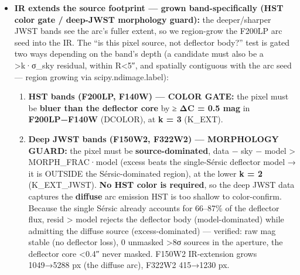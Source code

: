 \documentclass[
]{article}
\providecommand{\tightlist}{%
  \setlength{\itemsep}{0pt}\setlength{\parskip}{0pt}}
\newcommand{\BreakablePath}[1]{{\ttfamily\sloppy #1}}
\begin{document}
\begin{itemize}
  \begin{itemize}
  \tightlist
  \item
    \emph{Implementation gotcha (documented so it isn't reintroduced):}
    \BreakablePath{astropy.\discretionary{}{}{}modeling.\discretionary{}{}{}Sersic2D}'s
    \BreakablePath{amplitude} parameter is \textbf{I(r\_eff), not the
    central peak}. Since I(0)/I(r\_eff)=exp(b\_n)≈2150 at n=4,
    initialising \BreakablePath{amplitude} at the data peak
    over-predicts the centre \textasciitilde2000× and LevMar collapses
    the amplitude to ≈0 (the whole galaxy then reads as positive
    residual → catastrophic over-masking). Initialise
    \BreakablePath{amplitude ≈ peak·exp(−b\_\discretionary{}{}{}n)}
    (\textasciitilde peak·0.05 for n≈3) and \textbf{bound it to
    (peak·1e-3, peak·1.5)}, exactly as
    \BreakablePath{sersic\_\discretionary{}{}{}total\_\discretionary{}{}{}photometry.\discretionary{}{}{}fit\_\discretionary{}{}{}sersic2d}.
  \end{itemize}
\item
  \textbf{IR extends the source footprint --- grown band-specifically
  (HST color gate / deep-JWST morphology guard):} the deeper/sharper
  JWST bands see the arc's fuller extent, so we region-grow the F200LP
  arc seed into the IR. The ``is this pixel source, not deflector
  body?'' test is gated two ways depending on the band's depth (a
  candidate must also be a \textgreater k·σ\_sky residual, within
  R\textless5″, and spatially contiguous with the arc seed --- region
  growing via
  \BreakablePath{scipy.\discretionary{}{}{}ndimage.\discretionary{}{}{}label}):

  \begin{enumerate}
  \def\labelenumi{\arabic{enumi}.}
  \tightlist
  \item
    \textbf{HST bands (F200LP, F140W) --- COLOR GATE:} the pixel must be
    \textbf{bluer than the deflector core} by ≥ \textbf{ΔC = 0.5 mag} in
    \textbf{F200LP−F140W} (\BreakablePath{DCOLOR}), at \textbf{k = 3}
    (\BreakablePath{K\_\discretionary{}{}{}EXT}).
  \item
    \textbf{Deep JWST bands (F150W2, F322W2) --- MORPHOLOGY GUARD:} the
    pixel must be \textbf{source-dominated},
    \BreakablePath{data − sky − model > MORPH\_\discretionary{}{}{}FRAC·model}
    (excess beats the single-Sérsic deflector model → it is OUTSIDE the
    Sérsic-dominated region), at the lower \textbf{k = 2}
    (\BreakablePath{K\_\discretionary{}{}{}EXT\_\discretionary{}{}{}JWST}).
    \textbf{No HST color is required}, so the deep JWST data captures
    the \textbf{diffuse} arc emission HST is too shallow to
    color-confirm. Because the single Sérsic already accounts for
    66--87\% of the deflector flux, \BreakablePath{resid > model}
    rejects the deflector body (model-dominated) while admitting the
    diffuse source (excess-dominated) --- verified: raw mag stable (no
    deflector loss), 0 unmasked \textgreater8σ sources in the aperture,
    the deflector core \textless0.4″ never masked. F150W2 IR-extension
    grows 1049→5288 px (the diffuse arc), F322W2 415→1230 px.
  \end{enumerate}


\end{itemize}
\end{document}
